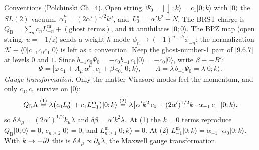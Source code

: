 \begin{tcolorbox}[breakable]
	\begin{remark}
		Conventions (Polchinski Ch.~4). Open string, $\Psi_0=|{\downarrow};k\rangle=c_1|0;k\rangle$ with $|0\rangle$ the $SL(2)$ vacuum, $\alpha_0^\mu=(2\alpha')^{1/2}k^\mu$, and $L_0^{\mathrm m}=\alpha'k^2+N$. The BRST charge is $Q_{\mathrm B}=\sum_nc_nL^{\mathrm m}_{-n}+(\text{ghost terms})$, and it annihilates $|0;0\rangle$. The BPZ map (open string, $u=-1/z$) sends a weight-$h$ mode $\phi_n\to(-1)^{n+h}\phi_{-n}$; the normalization $\mathcal K\equiv\langle0|c_{-1}c_0c_1|0\rangle$ is left as a convention. Keep the ghost-number-1 part of \eqref{9.6.7} at levels $0$ and $1$. Since $b_{-1}c_0\Psi_0=-c_0b_{-1}c_1|0\rangle=-c_0|0\rangle$, write $\beta\equiv-B'$:
		\begin{equation*}
			\Psi=\bigl[\varphi\,c_1+A_\mu\,\alpha^\mu_{-1}c_1+\beta\,c_0\bigr]|0;k\rangle ,\qquad \Lambda=\lambda\,b_{-1}\Psi_0=\lambda|0;k\rangle .
		\end{equation*}
		\emph{Gauge transformation.} Only the matter Virasoro modes feel the momentum, and only $c_0,c_1$ survive on $|0\rangle$:
		\begin{equation*}
			Q_{\mathrm B}\Lambda\overset{(1)}{=}\lambda\bigl(c_0L_0^{\mathrm m}+c_1L_{-1}^{\mathrm m}\bigr)|0;k\rangle\overset{(2)}{=}\lambda\bigl[\alpha'k^2\,c_0+(2\alpha')^{1/2}k\cdot\alpha_{-1}\,c_1\bigr]|0;k\rangle ,
		\end{equation*}
		so $\delta A_\mu=(2\alpha')^{1/2}k_\mu\lambda$ and $\delta\beta=\alpha'k^2\lambda$. At (1) the $k=0$ terms reproduce $Q_{\mathrm B}|0;0\rangle=0$, $c_{n\ge2}|0\rangle=0$, and $L^{\mathrm m}_{n\ge1}|0;k\rangle=0$. At (2) $L^{\mathrm m}_{-1}|0;k\rangle=\alpha_{-1}\cdot\alpha_0|0;k\rangle$. With $k\to-i\partial$ this is $\delta A_\mu\propto\partial_\mu\lambda$, the Maxwell gauge transformation.


\end{remark}
\end{tcolorbox}
